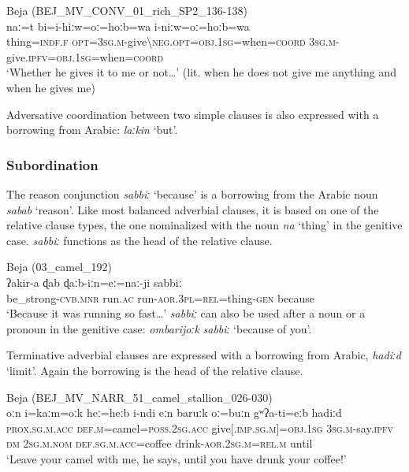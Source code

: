 \documentclass[output=paper]{langsci/langscibook}
\begin{document}
\ea\label{thing}
{{Beja (}BEJ\_MV\_CONV\_01\_rich\_SP2\_136-138)}\\
\gll naː=t bi=i-hiːw=oː=hoːb=wa i-niːw=oː=hoːb=wa\\
     thing=\textsc{indf.f} \textsc{opt=3sg.m-}give\textsc{\textbackslash neg.opt=obj.1sg}=when=\textsc{coord} \textsc{3sg.m-}give.\textsc{ipfv=obj.1sg}=when=\textsc{coord}\\
\glt `Whether he gives it to me or not…' (lit. when he does not give me anything and when he gives me)
\z

Adversative coordination between two simple clauses is also expressed with a borrowing from Arabic: \textit{laːkin} ‘but’.


 \subsubsection{Subordination}

The reason conjunction \textit{sabbiː} ‘because’ is a borrowing from the Arabic noun \textit{sabab} ‘reason’. Like most balanced adverbial clauses, it is based on one of the relative clause types, the one nominalized with the noun \textit{na} ‘thing’ in the genitive case. \textit{sabbiː} functions as the head of the relative clause.

\ea
{Beja ({03\_camel\_192)}}\\
\gll ʔakir-a ɖab ɖaːb-iːn=eː=naː-ji sabbiː\\
     be\_strong-\textsc{cvb.mnr} run.\textsc{ac} run-\textsc{aor.3pl=rel}=thing-\textsc{gen} because\\
\glt `Because it was running so fast…'
\z
\textit{sabbiː} can also be used after a noun or a pronoun in the genitive case: \textit{ombarijoːk} \textit{sabbiː} ‘because of you’.

Terminative adverbial clauses are expressed with a borrowing from Arabic, \textit{hadiːd} ‘limit’. Again the borrowing is the head of the relative clause.

\ea\label{ex:vanhove:}
{Beja (BEJ\_MV\_NARR\_51\_camel\_stallion\_026-030)}\\
\gll oːn i=kaːm=oːk heː=heːb i-ndi eːn baruːk oː=buːn gʷʔa-ti=eːb hadiːd\\
     \textsc{prox.sg.m.acc} \textsc{def.m}=camel=\textsc{poss.2sg.acc} give[.\textsc{imp.sg.m]=obj.1sg} \textsc{3sg.m}{}-say.\textsc{ipfv} \textsc{dm} \textsc{2sg.m.nom} \textsc{def.sg.m.acc}=coffee drink-\textsc{aor.2sg.m=rel.m} until\\
\glt `Leave your camel with me, he says, until you have drunk your coffee!'
\z
\end{document}
